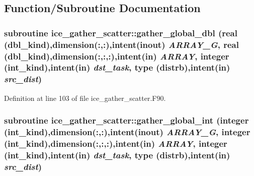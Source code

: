 \subsection{Function/Subroutine Documentation}
\hypertarget{namespaceice__gather__scatter_a21d73cccfa33b7e215f8dbe2af60ea8d}{
\subsubsection[{gather\_\-global\_\-dbl}]{\setlength{\rightskip}{0pt plus 5cm}subroutine ice\_\-gather\_\-scatter::gather\_\-global\_\-dbl (real (dbl\_\-kind),dimension(:,:),intent(inout) {\em ARRAY\_\-G}, \/  real (dbl\_\-kind),dimension(:,:,:),intent(in) {\em ARRAY}, \/  integer (int\_\-kind),intent(in) {\em dst\_\-task}, \/  type (distrb),intent(in) {\em src\_\-dist})}}
\label{namespaceice__gather__scatter_a21d73cccfa33b7e215f8dbe2af60ea8d}


Definition at line 103 of file ice\_\-gather\_\-scatter.F90.\hypertarget{namespaceice__gather__scatter_a7d152b84c73f88cb892a723d88f54d13}{
\subsubsection[{gather\_\-global\_\-int}]{\setlength{\rightskip}{0pt plus 5cm}subroutine ice\_\-gather\_\-scatter::gather\_\-global\_\-int (integer (int\_\-kind),dimension(:,:),intent(inout) {\em ARRAY\_\-G}, \/  integer (int\_\-kind),dimension(:,:,:),intent(in) {\em ARRAY}, \/  integer (int\_\-kind),intent(in) {\em dst\_\-task}, \/  type (distrb),intent(in) {\em src\_\-dist})}}
\label{namespaceice__gather__scatter_a7d152b84c73f88cb892a723d88f54d13}


